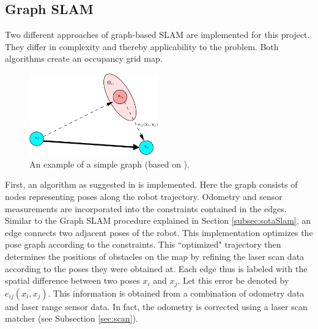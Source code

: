 \documentclass{ba-kecs}
\begin{document}
\subsection{Graph SLAM}
\label{sec:implSLAM}
Two different approaches of graph-based SLAM are implemented for this project. They differ in complexity and thereby applicability to the problem. Both algorithms create an occupancy grid map. 
\begin{figure}[h]
	\centering
		\includegraphics[width=0.50\textwidth]{figures/graph.png}
	\caption{An example of a simple graph (based on \citep{Grisetti}).}
	\label{fig:turtlebotexample_graph}
\end{figure}
First, an algorithm as suggested in \citep{Grisetti} is implemented. Here the graph consists of nodes representing poses along the robot trajectory. Odometry and sensor measurements are incorporated into the constraints contained in the edges. Similar to the Graph SLAM procedure explained in Section \ref{subsec:sotaSlam}, an edge connects two adjacent poses of the robot. This implementation optimizes the pose graph according to the constraints. This ``optimized" trajectory then determines the positions of obstacles on the map by refining the laser scan data according to the poses they were obtained at. Each edge thus is labeled with the spatial difference between two poses \(x_i\) and \(x_j\). Let this error be denoted by \(e_{ij}(x_i, x_j)\). This information is obtained from a combination of odometry data and laser range sensor data. In fact, the odometry is corrected using a laser scan matcher (see Subsection \ref{sec:scan}). 
\end{document}
